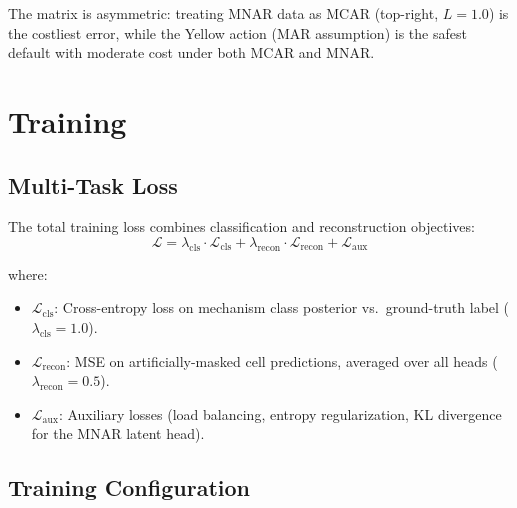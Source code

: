 \documentclass[11pt]{article}
\begin{document}
The matrix is asymmetric: treating MNAR data as MCAR (top-right, $L = 1.0$) is the costliest error, while the Yellow action (MAR assumption) is the safest default with moderate cost under both MCAR and MNAR.

\section{Training}
\label{sec:training}

\subsection{Multi-Task Loss}

The total training loss combines classification and reconstruction objectives:
\begin{equation}
\mathcal{L} = \lambda_{\text{cls}} \cdot \mathcal{L}_{\text{cls}} + \lambda_{\text{recon}} \cdot \mathcal{L}_{\text{recon}} + \mathcal{L}_{\text{aux}}
\label{eq:total_loss}
\end{equation}

where:
\begin{itemize}[nosep]
    \item $\mathcal{L}_{\text{cls}}$: Cross-entropy loss on mechanism class posterior vs.\ ground-truth label ($\lambda_{\text{cls}} = 1.0$).
    \item $\mathcal{L}_{\text{recon}}$: MSE on artificially-masked cell predictions, averaged over all heads ($\lambda_{\text{recon}} = 0.5$).
    \item $\mathcal{L}_{\text{aux}}$: Auxiliary losses (load balancing, entropy regularization, KL divergence for the MNAR latent head).
\end{itemize}

\subsection{Training Configuration}
\end{document}
